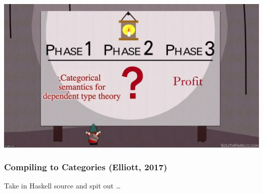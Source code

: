 \documentclass[
  xcolor={usenames,dvipsnames,svgnames},
  ]{beamer}
\begin{document}
{\usebackgroundtemplate%
{%
      \parbox[c][\paperheight][c]{\paperwidth}{\centering\includegraphics[width=\paperwidth]{graphics/profit.jpg}}
}
\begin{frame}
\end{frame}
}

\begin{frame}
  \frametitle{Compiling to Categories (Elliott, 2017)}
  Take in Haskell source and spit out \ldots
\end{frame}
\end{document}
